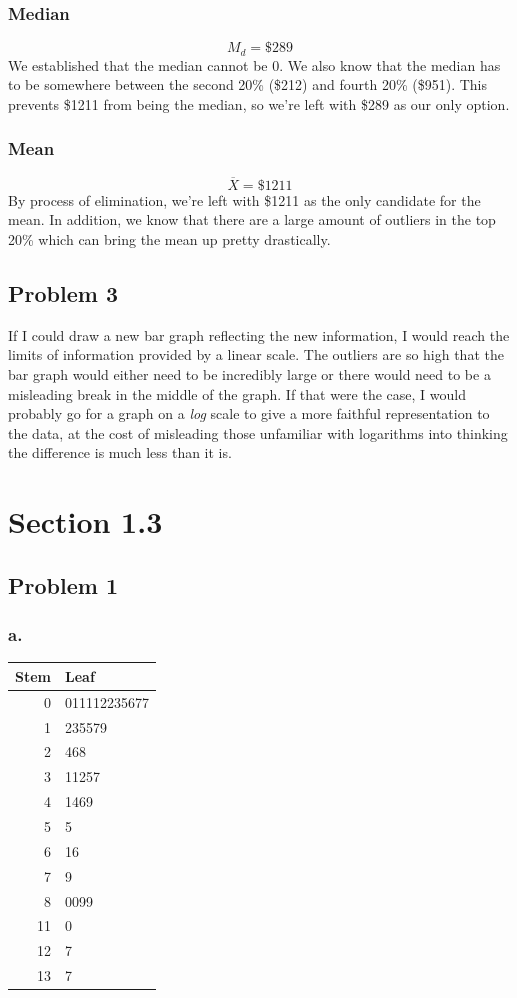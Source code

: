 \documentclass[11pt]{article}
\begin{document}
\subsubsection*{Median}
\[M_d = \$289\]
We established that the median cannot be 0. We also know that the median has to 
be somewhere between the second 20\% (\$212) and fourth 20\% (\$951). This
prevents \$1211 from being the median, so we're left with \$289 as our only
option.

\subsubsection*{Mean}
\[\overline{X} = \$1211\]
By process of elimination, we're left with \$1211 as the only candidate for the
mean. In addition, we know that there are a large amount of outliers in the top
20\% which can bring the mean up pretty drastically.

\subsection*{Problem 3}
If I could draw a new bar graph reflecting the new information, I would reach
the limits of information provided by a linear scale. The outliers are so high
that the bar graph would either need to be incredibly large or there would need
to be a misleading break in the middle of the graph. If that were the case, I
would probably go for a graph on a \textit{log} scale to give a more faithful
representation to the data, at the cost of misleading those unfamiliar with
logarithms into thinking the difference is much less than it is. 

\section*{Section 1.3}
\subsection*{Problem 1}
\subsubsection*{a.}
\begin{tabular}{r|l} %
    Stem & Leaf \\
    \hline %
    0 & 011112235677 \\
    1 & 235579 \\
    2 & 468 \\
    3 & 11257 \\
    4 & 1469 \\
    5 & 5 \\
    6 & 16 \\
    7 & 9 \\
    8 & 0099 \\
    11 & 0 \\
    12 & 7 \\
    13 & 7
\end{tabular}
\end{document}
